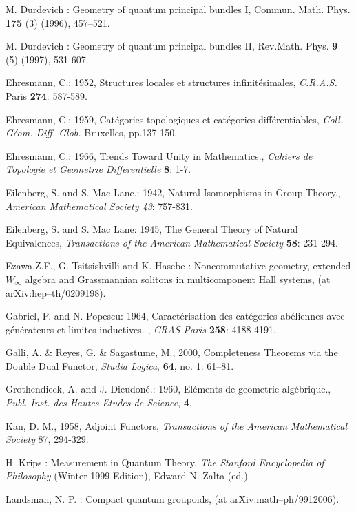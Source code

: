 \documentclass[12pt]{article}
\theoremstyle{plain}
\theoremstyle{definition}
\numberwithin{equation}{section}
\begin{document}
\begin{thebibliography}{99}
M. Durdevich : Geometry of quantum principal bundles I, Commun. Math. Phys. \textbf{175} (3) (1996), 457--521.

M. Durdevich : Geometry of quantum principal bundles II, Rev.Math. Phys. \textbf{9} (5) (1997), 531-607.

Ehresmann, C.: 1952, Structures locales et structures infinit\'esimales, \emph{C.R.A.S.} Paris \textbf{274}: 587-589.

Ehresmann, C.: 1959, Cat\'egories topologiques et cat\'egories diff\'erentiables, \emph{Coll. G\'eom. Diff. Glob.} Bruxelles, pp.137-150.

Ehresmann, C.: 1966, Trends Toward Unity in Mathematics., \emph{Cahiers de Topologie et Geometrie Differentielle}
\textbf{8}: 1-7.

Eilenberg, S. and S. Mac Lane.: 1942, Natural Isomorphisms in Group Theory., \emph{American Mathematical Society 43}: 757-831.

Eilenberg, S. and S. Mac Lane: 1945, The General Theory of Natural Equivalences, \emph{Transactions of the American Mathematical Society} \textbf{58}: 231-294.

Ezawa,Z.F., G. Tsitsishvilli and K. Hasebe : Noncommutative geometry, extended $W_{\infty}$ algebra and Grassmannian solitons in multicomponent Hall systems, (at arXiv:hep--th/0209198).

Gabriel, P. and N. Popescu: 1964, Caract\'{e}risation des cat\'egories ab\'eliennes avec g\'{e}n\'{e}rateurs et limites inductives. , \emph{CRAS Paris} \textbf{258}: 4188-4191.

Galli, A. \& Reyes, G. \& Sagastume, M., 2000, Completeness Theorems via the Double Dual Functor, {\em Studia Logica}, \textbf{64}, no. 1: 61--81.

Grothendieck, A. and J. Dieudon\'{e}.: 1960, El\'{e}ments de geometrie alg\'{e}brique., \emph{Publ. Inst. des Hautes Etudes de Science}, \textbf{4}.

Kan, D. M., 1958, Adjoint Functors, {\em Transactions of the American Mathematical Society} 87, 294-329.

H. Krips : Measurement in Quantum Theory, \emph{The Stanford Encyclopedia of Philosophy } (Winter 1999 Edition), Edward N. Zalta (ed.)

Landsman, N. P. : Compact quantum groupoids, (at arXiv:math--ph/9912006).


\end{thebibliography}
\end{document}
